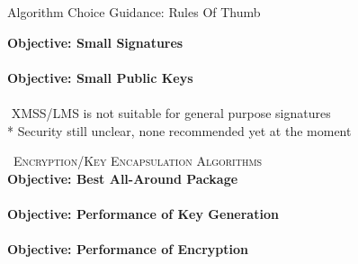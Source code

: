 \documentclass[11pt,english,a4paper, landscape]{scrartcl}
\begin{document}
\begin{minipage}[t]{0.7\textwidth}
\begin{algorithmbox}{Algorithm Choice Guidance: Rules Of Thumb}
\begin{minipage}[t]{0.5\textwidth}
				{\scriptsize \bfseries Objective: Small Signatures \tbv}\\[0.1\baselineskip]
				\\[0.75\baselineskip]
				{\scriptsize \bfseries Objective: Small Public Keys \tbv}\\[0.1\baselineskip]
				\\[0.75\baselineskip]
				{\tiny * \,\,XMSS/LMS is not suitable for general purpose signatures}\\[-0.5\baselineskip]
				{\tiny ** Security still unclear, none recommended yet at the moment}
			\end{minipage}
			\hfill
			\begin{minipage}[t]{0.5\textwidth}
				\vspace{0pt}
				{\scshape \faLock\, Encryption/Key Encapsulation Algorithms}\\
				{\scriptsize \bfseries Objective: Best All-Around Package \tbv}\\[0.1\baselineskip]
				\\[0.75\baselineskip]
				{\scriptsize \bfseries Objective: Performance of Key Generation \tbv}\\[0.1\baselineskip]
				\\[0.75\baselineskip]
				{\scriptsize \bfseries Objective: Performance of Encryption \tbv}\\[0.1\baselineskip]
				\\[0.75\baselineskip]

\end{minipage}
\end{algorithmbox}
\end{minipage}
\end{document}
